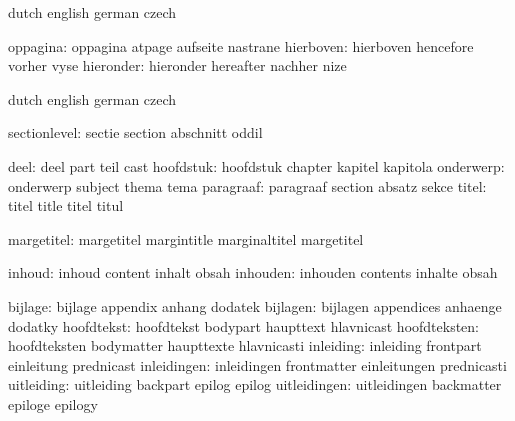 \stopvariables


\startvariables  dutch       english     german     czech

      oppagina:  oppagina    atpage      aufseite   nastrane
     hierboven:  hierboven   hencefore   vorher     vyse
     hieronder:  hieronder   hereafter   nachher    nize

\stopvariables




\startvariables       dutch                english             german
                      czech

       sectionlevel:  sectie               section             abschnitt
                      oddil

               deel:  deel                 part                teil
                      cast
          hoofdstuk:  hoofdstuk            chapter             kapitel
                      kapitola
          onderwerp:  onderwerp            subject             thema
                      tema
          paragraaf:  paragraaf            section             absatz
                      sekce
              titel:  titel                title               titel
                      titul

         margetitel:  margetitel           margintitle         marginaltitel
                      margetitel %

             inhoud:  inhoud               content             inhalt
                      obsah
           inhouden:  inhouden             contents            inhalte
                      obsah

            bijlage:  bijlage              appendix            anhang
                      dodatek
           bijlagen:  bijlagen             appendices          anhaenge
                      dodatky
         hoofdtekst:  hoofdtekst           bodypart            haupttext
                      hlavnicast
       hoofdteksten:  hoofdteksten         bodymatter          haupttexte
                      hlavnicasti
          inleiding:  inleiding            frontpart           einleitung
                      prednicast
        inleidingen:  inleidingen          frontmatter         einleitungen
                      prednicasti
         uitleiding:  uitleiding           backpart            epilog
                      epilog
       uitleidingen:  uitleidingen         backmatter          epiloge
                      epilogy

